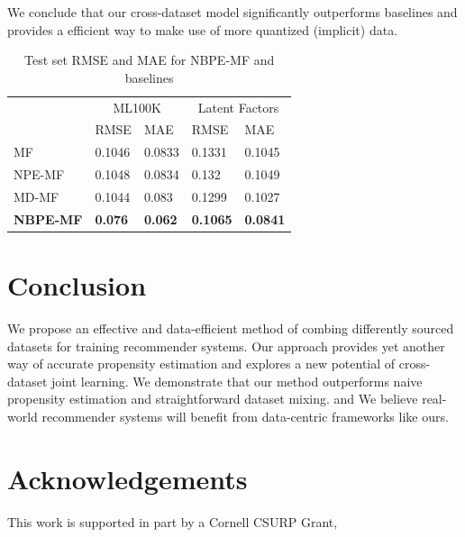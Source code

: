 \documentclass{article}
\begin{document}
We conclude that our cross-dataset model significantly outperforms baselines and provides a efficient way to make use of more quantized (implicit) data. 

\begin{table}
  \caption{Test set RMSE and MAE for NBPE-MF and baselines}
  \label{sample-table}
  \centering
  \begin{tabular}{lllll}
    \toprule               
                     & \multicolumn{2}{c}{ML100K} & \multicolumn{2}{c}{Latent Factors}                                     \\
    \cmidrule(r){2-5}
                     & RMSE                       & MAE                                & RMSE            & MAE             \\
    \midrule
    MF               & 0.1046                     & 0.0833                             & 0.1331          & 0.1045          \\ 
    NPE-MF           & 0.1048                     & 0.0834                             & 0.132           & 0.1049          \\ 
    MD-MF            & 0.1044                     & 0.083                              & 0.1299          & 0.1027          \\
    \textbf{NBPE-MF} & \textbf{0.076}             & \textbf{0.062}                     & \textbf{0.1065} & \textbf{0.0841} \\ 
    \bottomrule
  \end{tabular}
\end{table}

\section{Conclusion}
We propose an effective and data-efficient method of combing differently sourced datasets for training recommender systems. Our approach provides yet another way of accurate propensity estimation and explores a new potential of cross-dataset joint learning. We demonstrate that our method outperforms naive propensity estimation and straightforward dataset mixing. and  We believe real-world recommender systems will benefit from data-centric frameworks like ours.

\section*{Acknowledgements}
This work is supported in part by a Cornell CSURP Grant,  {}



\end{document}
